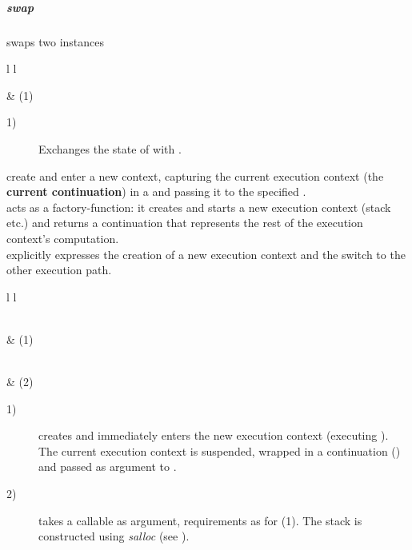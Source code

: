 \subparagraph*{swap}
swaps two \cont instances\\

\begin{tabular}{ l l }
    \midrule

     & (1)\\

    \midrule
\end{tabular}

\begin{description}
    \item[1)] Exchanges the state of  with .\\
\end{description}



create and enter a new context, capturing the current execution context (the
{\bfseries current continuation}) in a \cont and passing it to the
specified \entryfn.\\
\callcc acts as a factory-function: it creates and starts a new execution context
(stack etc.) and returns a continuation that represents the rest of the execution
context's computation.\\
\callcc explicitly expresses the creation of a new execution
context and the switch to the other execution path.\\

\begin{tabular}{ l l }
    \midrule

    \\
     & (1)\\

    \midrule

    \\
     & (2)\\

    \midrule
\end{tabular}

\begin{description}
    \item[1)] creates and immediately enters the new execution context
              (executing ). The current execution context is suspended,
              wrapped in a continuation (\cont) and passed as argument to
              .
    \item[2)] takes a callable as argument, requirements as for (1). The stack
              is constructed using \emph{salloc}
              (see ).
\end{description}

